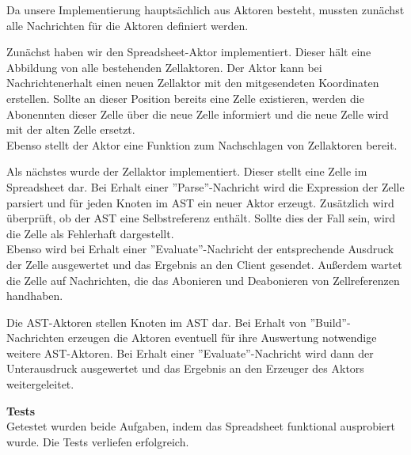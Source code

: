 \documentclass{rp}
\begin{document}
Da unsere Implementierung hauptsächlich aus Aktoren besteht, mussten zunächst alle Nachrichten für die Aktoren definiert werden. 

Zunächst haben wir den Spreadsheet-Aktor implementiert. Dieser hält eine Abbildung von alle bestehenden Zellaktoren. Der Aktor kann bei Nachrichtenerhalt einen neuen Zellaktor mit den mitgesendeten Koordinaten erstellen. Sollte an dieser Position bereits eine Zelle existieren, werden die Abonennten dieser Zelle über die neue Zelle informiert und die neue Zelle wird mit der alten Zelle ersetzt. \\
Ebenso stellt der Aktor eine Funktion zum Nachschlagen von Zellaktoren bereit.

Als nächstes wurde der Zellaktor implementiert. Dieser stellt eine Zelle im Spreadsheet dar. Bei Erhalt einer ''Parse''-Nachricht wird die Expression der Zelle parsiert und für jeden Knoten im AST ein neuer Aktor erzeugt. Zusätzlich wird überprüft, ob der AST eine Selbstreferenz enthält. Sollte dies der Fall sein, wird die Zelle als Fehlerhaft dargestellt. \\ 
Ebenso wird bei Erhalt einer ''Evaluate''-Nachricht der entsprechende Ausdruck der Zelle ausgewertet und das Ergebnis an den Client gesendet. Außerdem wartet die Zelle auf Nachrichten, die das Abonieren und Deabonieren von Zellreferenzen handhaben.

Die AST-Aktoren stellen Knoten im AST dar. Bei Erhalt von ''Build''-Nachrichten erzeugen die Aktoren eventuell für ihre Auswertung notwendige weitere AST-Aktoren. Bei Erhalt einer ''Evaluate''-Nachricht wird dann der Unterausdruck ausgewertet und das Ergebnis an den Erzeuger des Aktors weitergeleitet.

\textbf{Tests}\\
Getestet wurden beide Aufgaben, indem das Spreadsheet funktional ausprobiert wurde. Die Tests verliefen erfolgreich.
\end{document}
